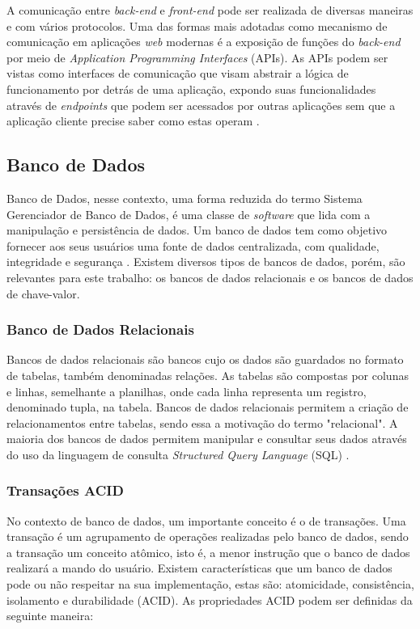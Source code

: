 A comunicação entre \textit{back-end} e \textit{front-end} pode ser realizada de diversas maneiras e com vários protocolos. Uma das formas mais adotadas como mecanismo de comunicação em aplicações \textit{web} modernas é a exposição de funções do \textit{back-end} por meio de \textit{Application Programming Interfaces} (APIs). As APIs podem ser vistas como interfaces de comunicação que visam abstrair a lógica de funcionamento por detrás de uma aplicação, expondo suas funcionalidades através de \textit{endpoints} que podem ser acessados por outras aplicações sem que a aplicação cliente precise saber como estas operam \cite{gough2021mastering}.

\subsection{Banco de Dados}

Banco de Dados, nesse contexto, uma forma reduzida do termo Sistema Gerenciador de Banco de Dados, é uma classe de \textit{software} que lida com a manipulação e persistência de dados. Um banco de dados tem como objetivo fornecer aos seus usuários uma fonte de dados centralizada, com qualidade, integridade e segurança \cite{fry1976evolution}. Existem diversos tipos de bancos de dados, porém, são relevantes para este trabalho: os bancos de dados relacionais e os bancos de dados de chave-valor.

\subsubsection{Banco de Dados Relacionais}

Bancos de dados relacionais são bancos cujo os dados são guardados no formato de tabelas, também denominadas relações. As tabelas são compostas por colunas e linhas, semelhante a planilhas, onde cada linha representa um registro, denominado tupla, na tabela. Bancos de dados relacionais permitem a criação de relacionamentos entre tabelas, sendo essa a motivação do termo "relacional". A maioria dos bancos de dados permitem manipular e consultar seus dados através do uso da linguagem de consulta \textit{Structured Query Language} (SQL) \cite{jatana2012survey}.

\subsubsection{Transações ACID}

No contexto de banco de dados, um importante conceito é o de transações. Uma transação é um agrupamento de operações realizadas pelo banco de dados, sendo a transação um conceito atômico, isto é, a menor instrução que o banco de dados realizará a mando do usuário. Existem características que um banco de dados pode ou não respeitar na sua implementação, estas são: atomicidade, consistência, isolamento e durabilidade (ACID). As propriedades ACID podem ser definidas da seguinte maneira:

